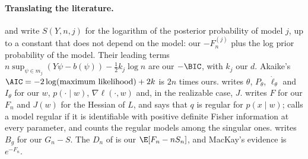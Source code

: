 \begin{refsection}
\paragraph{Translating the literature.} \Textcite{Schwarz1978} and \textcite{Haughton1988} write $S(Y,n,j)$ for the logarithm of the posterior probability of model $j$, up to a constant that does not depend on the model: our $-F_n^{(j)}$ plus the log prior probability of the model. Their leading terms $n\sup_{\psi\in m_j}(Y\psi-b(\psi))-\frac12k_j\log n$ are our $-\BIC$, with $k_j$ our $d$. Akaike's $\AIC=-2\log(\text{maximum likelihood})+2k$ is $2n$ times ours. \Textcite{vanderVaart1998} writes $\theta$, $P_\theta$, $\dot\ell_\theta$ and $I_\theta$ for our $w$, $p(\cdot\mid w)$, $\nabla\ell(\cdot,w)$ and, in the realizable case, $J$. \Textcite{Watanabe2013} writes $F$ for our $F_n$ and $J(w)$ for the Hessian of $L$, and says that $q$ is regular for $p(x\mid w)$; \textcite{Watanabe2009} calls a model regular if it is identifiable with positive definite Fisher information at every parameter, and counts the regular models among the singular ones. \Textcite{Watanabe2010a} writes $B_g$ for our $G_n-S$. The $D_n$ of \textcite{ClarkeBarron1990} is our $\E[F_n-nS_n]$, and MacKay's evidence is $e^{-F_n}$.

\printchapterbib
\end{refsection}
